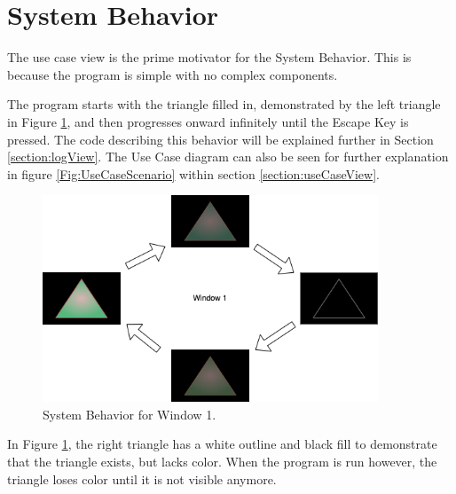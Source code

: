 \section{System Behavior}
\label{section:sysBehavior}

The use case view is the prime motivator for the System Behavior.
This is because the program is simple with no complex components.

The program starts with the triangle filled in, demonstrated by the left triangle in Figure \ref{Fig:SysBehaviorWindow1}, and then progresses onward infinitely until the Escape Key is pressed.
The code describing this behavior will be explained further in Section \ref{section:logView}.
The Use Case diagram can also be seen for further explanation in figure \ref{Fig:UseCaseScenario} within section \ref{section:useCaseView}.

\begin{figure}[htb]
    \centering
    \includegraphics[width=10cm]{./Images/SysBehavior.png}
       \caption{System Behavior for Window 1.}
           \label{Fig:SysBehaviorWindow1}
\end{figure}

In Figure \ref{Fig:SysBehaviorWindow1}, the right triangle has a white outline and black fill to demonstrate that the triangle exists, but lacks color.
When the program is run however, the triangle loses color until it is not visible anymore.